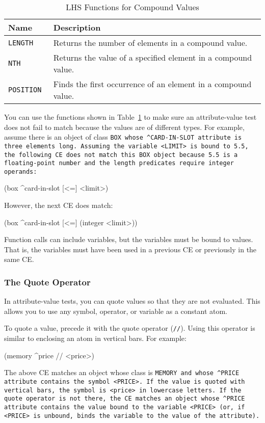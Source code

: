 \begin{table}[h]
  \centering
  \begin{tabular}{ll}
    \toprule
    Name & Description \\
    \midrule
    \tt{LENGTH} & Returns the number of elements in a compound value. \\
    \tt{NTH} & Returns the value of a specified element in a compound value. \\
    \tt{POSITION} & Finds the first occurrence of an element in a compound value. \\
    \bottomrule
  \end{tabular}
  \caption{LHS Functions for Compound Values}
  \label{t:3-5}
\end{table}

You can use the functions shown in Table~\ref{t:3-5} to make sure an
attribute-value test does not fail to match because the values are of
different types. For example, assume there is an object of class
\tt{BOX} whose \verb|^CARD-IN-SLOT| attribute is three elements
long. Assuming the variable \verb|<LIMIT>| is bound to 5.5, the
following CE does not match this \tt{BOX} object because 5.5 is a
floating-point number and the length predicates require integer
operands:
\begin{qv}
(box ^card-in-slot [<=] <limit>)
\end{qv}
  However, the next CE does match:
\begin{qv}
(box ^card-in-slot [<=] (integer <limit>))
\end{qv}
Function calls can include variables, but the variables
  must be bound to values. That is, the variables must
  have been used in a previous CE or previously in the
  same CE.

\subsubsection{The Quote Operator}

  In attribute-value tests, you can quote values so that
  they are not evaluated. This allows you to use any
  symbol, operator, or variable as a constant atom.

  To quote a value, precede it with the quote operator
  (\verb|//|). Using this operator is similar to enclosing an
  atom in vertical bars. For example:
\begin{qv}
(memory ^price // <price>)
\end{qv}
The above CE matches an object whose class is \tt{MEMORY} and whose
\verb|^PRICE| attribute contains the symbol \verb|<PRICE>|. If the
value is quoted with vertical bars, the symbol is \verb|<price>| in
lowercase letters. If the quote operator is not there, the CE matches
an object whose \verb|^PRICE| attribute contains the value bound to
the variable \verb|<PRICE>| (or, if \verb|<PRICE>| is unbound, binds
the variable to the value of the attribute).


